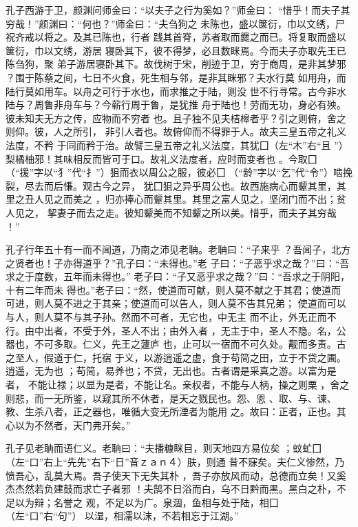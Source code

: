 \documentclass[]{article}
\begin{document}
孔子西游于卫，颜渊问师金曰：``以夫子之行为奚如？''师金曰：
``惜乎！而夫子其穷哉！''颜渊曰：``何也？''师金曰：``夫刍狗之
未陈也，盛以箧衍，巾以文绣，尸祝齐戒以将之。及其已陈也，行者
践其首脊，苏者取而爨之而已。将复取而盛以箧衍，巾以文绣，游居
寝卧其下，彼不得梦，必且数眯焉。今而夫子亦取先王已陈刍狗，聚
弟子游居寝卧其下。故伐树于宋，削迹于卫，穷于商周，是非其梦邪
？围于陈蔡之间，七日不火食，死生相与邻，是非其眯邪？夫水行莫
如用舟，而陆行莫如用车。以舟之可行于水也，而求推之于陆，则没
世不行寻常。古今非水陆与？周鲁非舟车与？今蕲行周于鲁，是犹推
舟于陆也！劳而无功，身必有殃。彼未知夫无方之传，应物而不穷者
也。且子独不见夫桔槔者乎？引之则俯，舍之则仰。彼，人之所引，
非引人者也。故俯仰而不得罪于人。故夫三皇五帝之礼义法度，不矜
于同而矜于治。故譬三皇五帝之礼义法度，其犹囗（左``木''右``且
''）梨橘柚邪！其味相反而皆可于口。故礼义法度者，应时而变者也
。今取囗（``援''字以``犭''代``扌''）狙而衣以周公之服，彼必囗
（``龄''字以``乞''代``令''）啮挽裂，尽去而后慊。观古今之异，
犹囗狙之异乎周公也。故西施病心而颦其里，其里之丑人见之而美之
，归亦捧心而颦其里。其里之富人见之，坚闭门而不出；贫人见之，
挈妻子而去之走。彼知颦美而不知颦之所以美。惜乎，而夫子其穷哉 ！''

孔子行年五十有一而不闻道，乃南之沛见老聃。老聃曰：``子来乎
？吾闻子，北方之贤者也！子亦得道乎？''孔子曰：``未得也。''老
子曰：``子恶乎求之哉？''曰：``吾求之于度数，五年而未得也。''
老子曰：``子又恶乎求之哉？''曰：``吾求之于阴阳，十有二年而未
得也。''老子曰：``然，使道而可献，则人莫不献之于其君；使道而
可进，则人莫不进之于其亲；使道而可以告人，则人莫不告其兄弟；
使道而可以与人，则人莫不与其子孙。然而不可者，无它也，中无主
而不止，外无正而不行。由中出者，不受于外，圣人不出；由外入者
，无主于中，圣人不隐。名，公器也，不可多取。仁义，先王之蘧庐
也，止可以一宿而不可久处。觏而多责。古之至人，假道于仁，托宿
于义，以游逍遥之虚，食于苟简之田，立于不贷之圃。逍遥，无为也
；苟简，易养也；不贷，无出也。古者谓是采真之游。以富为是者，
不能让禄；以显为是者，不能让名。亲权者，不能与人柄，操之则栗
，舍之则悲，而一无所鉴，以窥其所不休者，是天之戮民也。怨、恩
、取、与、谏、教、生杀八者，正之器也，唯循大变无所湮者为能用
之。故曰：正者，正也。其心以为不然者，天门弗开矣。''

孔子见老聃而语仁义。老聃曰：``夫播糠眯目，则天地四方易位矣
；蚊虻囗（左``口''右上``先先''右下``日''音ｚａｎ４）肤，则通
昔不寐矣。夫仁义惨然，乃愤吾心，乱莫大焉。吾子使天下无失其朴
，吾子亦放风而动，总德而立矣！又奚杰杰然若负建鼓而求亡子者邪
！夫鹄不日浴而白，乌不日黔而黑。黑白之朴，不足以为辩；名誉之
观，不足以为广。泉涸，鱼相与处于陆，相囗（左``口''右``句''）
以湿，相濡以沫，不若相忘于江湖。''
\end{document}
